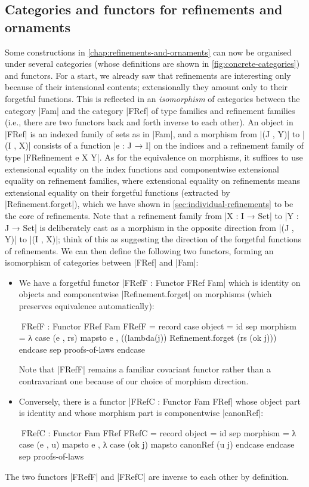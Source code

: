 \subsection{Categories and functors for refinements and ornaments}
\label{sec:concrete-categories}

Some constructions in \autoref{chap:refinements-and-ornaments} can now be organised under several categories (whose definitions are shown in \autoref{fig:concrete-categories}) and functors.
For a start, we already saw that refinements are interesting only because of their intensional contents; extensionally they amount only to their forgetful functions.
This is reflected in an \emph{isomorphism} of categories between the category |Fam| and the category |FRef| of type families and refinement families (i.e., there are two functors back and forth inverse to each other).
An object in |FRef| is an indexed family of sets as in |Fam|, and a morphism from |(J , Y)| to |(I , X)| consists of a function |e : J → I| on the indices and a refinement family of type |FRefinement e X Y|.
As for the equivalence on morphisms, it suffices to use extensional equality on the index functions and componentwise extensional equality on refinement families, where extensional equality on refinements means extensional equality on their forgetful functions (extracted by |Refinement.forget|), which we have shown in \autoref{sec:individual-refinements} to be the core of refinements.
Note that a refinement family from |X : I → Set| to |Y : J → Set| is deliberately cast as a morphism in the opposite direction from |(J , Y)| to |(I , X)|; think of this as suggesting the direction of the forgetful functions of refinements.
We can then define the following two functors, forming an isomorphism of categories between |FRef| and |Fam|:
\begin{itemize}
\item We have a forgetful functor |FRefF : Functor FRef Fam| which is identity on objects and componentwise |Refinement.forget| on morphisms (which preserves equivalence automatically):
\begin{code}
^^^FRefF : Functor FRef Fam
FRefF = record
  case  object     = id
  sep   morphism   = λ case (e , rs) mapsto e , ((lambda(j)) Refinement.forget (rs (ok j))) endcase
  sep   proofs-of-laws endcase
\end{code}
Note that |FRefF| remains a familiar covariant functor rather than a contravariant one because of our choice of morphism direction.
\item Conversely, there is a functor |FRefC : Functor Fam FRef| whose object part is identity and whose morphism part is componentwise |canonRef|:
\begin{code}
^^^FRefC : Functor Fam FRef
FRefC = record
  {    object    =  id
  sep  morphism  =  λ case (e , u) mapsto e , λ case (ok j) mapsto canonRef (u {j}) endcase endcase
  sep  proofs-of-laws }
\end{code}
\end{itemize}
The two functors |FRefF| and |FRefC| are inverse to each other by definition.


